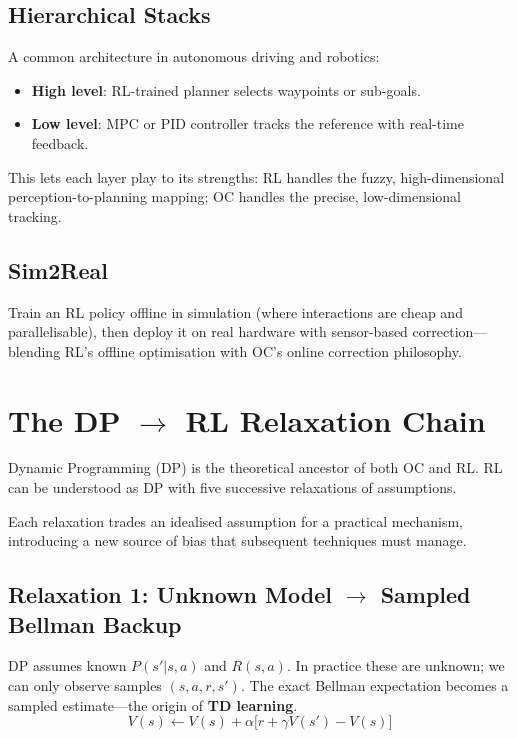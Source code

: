 \subsection{Hierarchical Stacks}

A common architecture in autonomous driving and robotics:
\begin{itemize}
  \item \textbf{High level}: RL-trained planner selects waypoints or sub-goals.
  \item \textbf{Low level}: MPC or PID controller tracks the reference with real-time feedback.
\end{itemize}
This lets each layer play to its strengths: RL handles the fuzzy, high-dimensional perception-to-planning mapping; OC handles the precise, low-dimensional tracking.

\subsection{Sim2Real}

Train an RL policy offline in simulation (where interactions are cheap and parallelisable), then deploy it on real hardware with sensor-based correction---blending RL's offline optimisation with OC's online correction philosophy.

\section{The DP $\to$ RL Relaxation Chain}
\label{sec:dp-relaxation}

Dynamic Programming (DP) is the theoretical ancestor of both OC and RL.
RL can be understood as DP with five successive relaxations of assumptions.

\begin{keyidea}
Each relaxation trades an idealised assumption for a practical mechanism, introducing a new source of bias that subsequent techniques must manage.
\end{keyidea}

\subsection{Relaxation 1: Unknown Model $\to$ Sampled Bellman Backup}

DP assumes known $P(s'|s,a)$ and $R(s,a)$.
In practice these are unknown; we can only observe samples $(s,a,r,s')$.
The exact Bellman expectation becomes a sampled estimate---the origin of \textbf{TD learning}.
\[
  V(s) \leftarrow V(s) + \alpha\bigl[r + \gamma V(s') - V(s)\bigr]
\]

